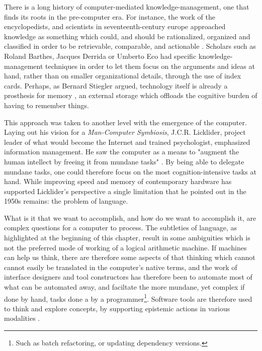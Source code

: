 There is a long history of computer-mediated knowledge-management, one that finds its roots in the pre-computer era. For instance, the work of the encyclopedists, and scientists in seventeenth-century europe approached knowledge as something which could, and should be rationalized, organized and classified in order to be retrievable, comparable, and actionable \citep{sack_software_2019}. Scholars such as Roland Barthes, Jacques Derrida or Umberto Eco had specific knowledge-management techniques in order to let them focus on the arguments and ideas at hand, rather than on smaller organizational details, through the use of index cards. Perhaps, as Bernard Stiegler argued, technology itself is already a prosthesis for memory \citep{wilken_card_2010}, an external storage which offloads the cognitive burden of having to remember things.

This approach was taken to another level with the emergence of the computer. Laying out his vision for a \emph{Man-Computer Symbiosis}, J.C.R. Licklider, project leader of what would become the Internet and trained psychologist, emphasized information management. He saw the computer as a means to "augment the human intellect by freeing it from mundane tasks" \citep{licklider_mancomputer_1960}. By being able to delegate mundane tasks, one could therefore focus on the most cognition-intensive tasks at hand. While improving speed and memory of contemporary hardware has supported Licklider's perspective a single limitation that he pointed out in the 1950s remains: the problem of language.

What is it that we want to accomplish, and how do we want to accomplish it, are complex questions for a computer to process. The subtleties of language, as highlighted at the beginning of this chapter, result in some ambiguities which is not the preferred mode of working of a logical arithmetic machine. If machines can help us think, there are therefore some aspects of that thinking which cannot cannot easily be translated in the computer's native terms, and the work of interface designers and tool constructors has therefore been to automate most of what can be automated away, and faciltate the more mundane, yet complex if done by hand, tasks done a by a programmer\footnote{Such as batch refactoring, or updating dependency versions.}. Software tools are therefore used to think and explore concepts, by supporting epistemic actions in various modalities \citep{victor_humane_2014}.

